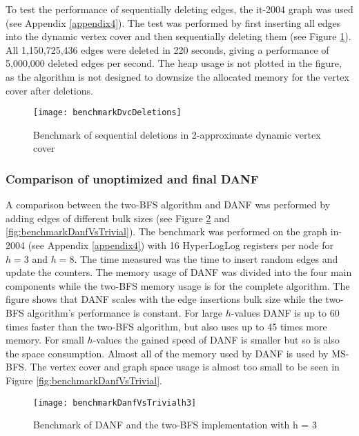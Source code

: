 To test the performance of sequentially deleting edges, the it-2004 graph was used (see Appendix \ref{appendix4}). The test was performed by first inserting all edges into the dynamic vertex cover and then sequentially deleting them (see Figure \ref{fig:benchmarkDvcDeletions}). All 1,150,725,436 edges were deleted in 220 seconds, giving a performance of 5,000,000 deleted edges per second. The heap usage is not plotted in the figure, as the algorithm is not designed to downsize the allocated memory for the vertex cover after deletions. 

\begin{figure}[h]
\centering
\texttt{[image: benchmarkDvcDeletions]}    
\captionsetup{justification=centering}
\caption {Benchmark of sequential deletions in 2-approximate dynamic vertex cover}
\label{fig:benchmarkDvcDeletions}
\end{figure}



\subsubsection{Comparison of unoptimized and final DANF}
A comparison between the two-BFS algorithm and DANF was performed by adding edges of different bulk sizes (see Figure \ref{fig:benchmarkDanfVsTrivialh3} and \ref{fig:benchmarkDanfVsTrivial}). The benchmark was performed on the graph in-2004 (see Appendix \ref{appendix4})  with 16 HyperLogLog registers per node for $h = 3$ and $h = 8$. The time measured was the time to insert random edges and update the counters. The memory usage of DANF was divided into the four main components while the two-BFS memory usage is for the complete algorithm. The figure shows that DANF scales with the edge insertions bulk size while the two-BFS algorithm's performance is constant. For large $h$-values DANF is up to 60 times faster than the two-BFS algorithm, but also uses up to 45 times more memory. For small $h$-values the gained speed of DANF is smaller but so is also the space consumption. Almost all of the memory used by DANF is used by MS-BFS. The vertex cover and graph space usage is almost too small to be seen in Figure \ref{fig:benchmarkDanfVsTrivial}. 

\begin{figure}[h]
\centering
\texttt{[image: benchmarkDanfVsTrivialh3]}    
\captionsetup{justification=centering}
\caption {Benchmark of DANF and the two-BFS implementation with h = 3}
\label{fig:benchmarkDanfVsTrivialh3}
\end{figure}

